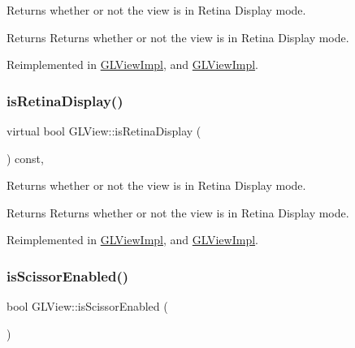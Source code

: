 Returns whether or not the view is in Retina Display mode.

\begin{DoxyReturn}{Returns}
Returns whether or not the view is in Retina Display mode. 
\end{DoxyReturn}


Reimplemented in \hyperlink{classGLViewImpl_a3c02a8e95e8f2ee4821935f78be3f6b0}{G\+L\+View\+Impl}, and \hyperlink{classGLViewImpl_a3c02a8e95e8f2ee4821935f78be3f6b0}{G\+L\+View\+Impl}.

\mbox{\label{classGLView_a6b51811c80d053326246f2f318010edc}} 
\subsubsection{\texorpdfstring{is\+Retina\+Display()}{isRetinaDisplay()}\hspace{0.1cm}{\footnotesize\ttfamily [2/2]}}
{\footnotesize\ttfamily virtual bool G\+L\+View\+::is\+Retina\+Display (\begin{DoxyParamCaption}{ }\end{DoxyParamCaption}) const\hspace{0.3cm}{\ttfamily [inline]}, {\ttfamily [virtual]}}

Returns whether or not the view is in Retina Display mode.

\begin{DoxyReturn}{Returns}
Returns whether or not the view is in Retina Display mode. 
\end{DoxyReturn}


Reimplemented in \hyperlink{classGLViewImpl_a3c02a8e95e8f2ee4821935f78be3f6b0}{G\+L\+View\+Impl}, and \hyperlink{classGLViewImpl_a3c02a8e95e8f2ee4821935f78be3f6b0}{G\+L\+View\+Impl}.

\mbox{\label{classGLView_a0dccbd245a5f49590693fd46a55d322d}} 
\subsubsection{\texorpdfstring{is\+Scissor\+Enabled()}{isScissorEnabled()}\hspace{0.1cm}{\footnotesize\ttfamily [1/2]}}
{\footnotesize\ttfamily bool G\+L\+View\+::is\+Scissor\+Enabled (\begin{DoxyParamCaption}{ }\end{DoxyParamCaption})\hspace{0.3cm}{\ttfamily [virtual]}}

